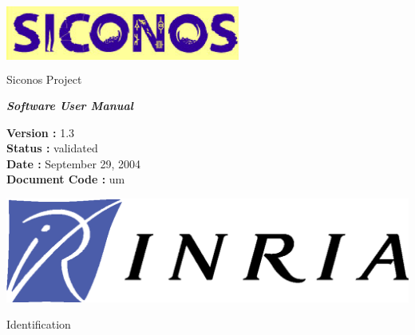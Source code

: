\thispagestyle{empty}

\begin{center}
\includegraphics[height=23mm, width=77mm]{figure/siconos.eps}\\
\textsf{Siconos Project}\\[6cm]
\end{center}

\begin{center}
\huge
\textsf{\textbf{\textit{Software User Manual}}}\\[2.5cm]
\end{center}

\large
\begin{center}
\textsf{\textbf{Version :} 1.3}\\
\textsf{\textbf{Status :}  validated}\\
\textsf{\textbf{Date :} September 29, 2004}\\
\textsf{\textbf{Document Code :} \acs{um}}\\[5cm]

\end{center}

\normalsize

\begin{flushright}
\includegraphics[scale=0.3]{figure/Logo-INRIA.eps}
\end{flushright}

\clearpage




\normalsize

\begin{center}
  \textsf{\Large Identification}
\end{center}

